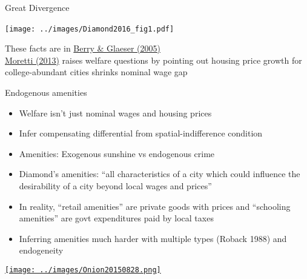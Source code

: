 \documentclass[10pt,notes=hide]{beamer}
\begin{document}
\begin{frame}{Great Divergence}
\begin{center}
\texttt{[image: ../images/Diamond2016\_fig1.pdf]}\
\end{center}
\vspace{-4mm}
{\small
	These facts are in \href{https://onlinelibrary.wiley.com/doi/abs/10.1111/j.1435-5957.2005.00047.x}{Berry \& Glaeser (2005)} \\
\href{https://www.aeaweb.org/articles?id=10.1257/app.5.1.65}{Moretti (2013)} raises welfare questions by pointing out housing price growth for college-abundant cities shrinks nominal wage gap
}
\end{frame}
\begin{frame}{Endogenous amenities}
\begin{itemize}
	\item Welfare isn't just nominal wages and housing prices
	\item Infer compensating differential from spatial-indifference condition
	\item Amenities: Exogenous sunshine vs endogenous crime
	\item Diamond's amenities: ``all characteristics of a city which could influence the desirability of a city beyond local wages and prices''
	\item In reality, ``retail amenities'' are private goods with prices and ``schooling amenities'' are govt expenditures paid by local taxes
	\item Inferring amenities much harder with multiple types (Roback 1988) and endogeneity
\end{itemize}
\vspace{4mm}
\href{https://local.theonion.com/neighborhood-starting-to-get-too-safe-for-family-to-aff-1819578182}{\texttt{[image: ../images/Onion20150828.png]}}
\end{frame}
\end{document}
